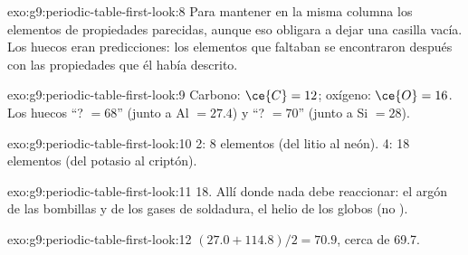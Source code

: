 \begin{solution}{exo:g9:periodic-table-first-look:8}
Para mantener en la misma columna los elementos de propiedades
parecidas, aunque eso obligara a dejar una casilla vacía. Los huecos
eran predicciones: los elementos que faltaban se encontraron después con
las propiedades que él había descrito.
\end{solution}

\begin{solution}{exo:g9:periodic-table-first-look:9}
Carbono: $\ce{C} = 12$; oxígeno: $\ce{O} = 16$. Los huecos ``? $= 68$''
(junto a Al $= 27.4$) y ``? $= 70$'' (junto a Si $= 28$).
\end{solution}

\begin{solution}{exo:g9:periodic-table-first-look:10}
 2: 8 elementos (del litio al neón).  4: 18 elementos (del
potasio al criptón).
\end{solution}

\begin{solution}{exo:g9:periodic-table-first-look:11}
 18. Allí donde nada debe reaccionar: el argón de las bombillas y
de los gases de soldadura, el helio de los globos (no ).
\end{solution}

\begin{solution}{exo:g9:periodic-table-first-look:12}
$(27.0 + 114.8)/2 = 70.9$, cerca de 69.7.
\end{solution}

